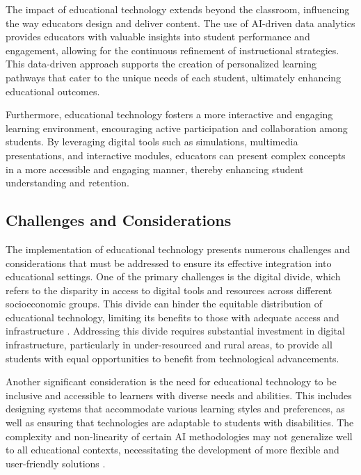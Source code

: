 The impact of educational technology extends beyond the classroom, influencing the way educators design and deliver content. The use of AI-driven data analytics provides educators with valuable insights into student performance and engagement, allowing for the continuous refinement of instructional strategies. This data-driven approach supports the creation of personalized learning pathways that cater to the unique needs of each student, ultimately enhancing educational outcomes.



Furthermore, educational technology fosters a more interactive and engaging learning environment, encouraging active participation and collaboration among students. By leveraging digital tools such as simulations, multimedia presentations, and interactive modules, educators can present complex concepts in a more accessible and engaging manner, thereby enhancing student understanding and retention.





\subsection{Challenges and Considerations} \label{subsec:Challenges and Considerations}



The implementation of educational technology presents numerous challenges and considerations that must be addressed to ensure its effective integration into educational settings. One of the primary challenges is the digital divide, which refers to the disparity in access to digital tools and resources across different socioeconomic groups. This divide can hinder the equitable distribution of educational technology, limiting its benefits to those with adequate access and infrastructure \cite{kasneci2023chatgpt}. Addressing this divide requires substantial investment in digital infrastructure, particularly in under-resourced and rural areas, to provide all students with equal opportunities to benefit from technological advancements.



Another significant consideration is the need for educational technology to be inclusive and accessible to learners with diverse needs and abilities. This includes designing systems that accommodate various learning styles and preferences, as well as ensuring that technologies are adaptable to students with disabilities. The complexity and non-linearity of certain AI methodologies may not generalize well to all educational contexts, necessitating the development of more flexible and user-friendly solutions \cite{vashishtha2019restoringchaosusingdeep}.



